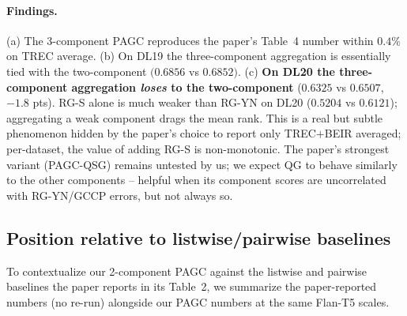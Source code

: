 \documentclass[sigconf]{acmart}
\begin{document}
\paragraph{Findings.} (a) The 3-component PAGC reproduces the paper's
Table~4 number within $0.4\%$ on TREC average. (b) On DL19 the
three-component aggregation is essentially tied with the two-component
$(0.6856$ vs $0.6852)$. (c) \textbf{On DL20 the three-component
aggregation \emph{loses} to the two-component} ($0.6325$ vs $0.6507$,
$-1.8$ pts). RG-S alone is much weaker than RG-YN on DL20 ($0.5204$
vs $0.6121$); aggregating a weak component drags the mean rank.
This is a real but subtle phenomenon hidden by the paper's choice to
report only TREC$+$BEIR averaged; per-dataset, the value of adding
RG-S is non-monotonic. The paper's strongest variant (PAGC-QSG)
remains untested by us; we expect QG to behave similarly to the
other components -- helpful when its component scores are uncorrelated
with RG-YN/GCCP errors, but not always so.

\subsection{Position relative to listwise/pairwise baselines}
\label{sec:rankgpt}

To contextualize our 2-component PAGC against the listwise and
pairwise baselines the paper reports in its Table~2, we summarize
the paper-reported numbers (no re-run) alongside our PAGC numbers
at the same Flan-T5 scales.
\end{document}
